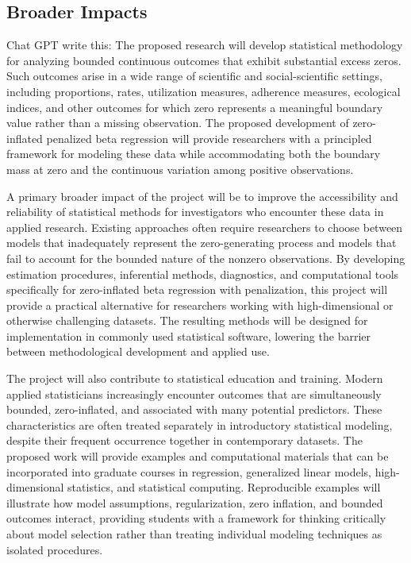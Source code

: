 \documentclass[
  11pt,
  letterpaper,
]{article}
\begin{document}
\subsection{Broader Impacts}\label{broader-impacts-2}

Chat GPT write this: The proposed research will develop statistical
methodology for analyzing bounded continuous outcomes that exhibit
substantial excess zeros. Such outcomes arise in a wide range of
scientific and social-scientific settings, including proportions, rates,
utilization measures, adherence measures, ecological indices, and other
outcomes for which zero represents a meaningful boundary value rather
than a missing observation. The proposed development of zero-inflated
penalized beta regression will provide researchers with a principled
framework for modeling these data while accommodating both the boundary
mass at zero and the continuous variation among positive observations.

A primary broader impact of the project will be to improve the
accessibility and reliability of statistical methods for investigators
who encounter these data in applied research. Existing approaches often
require researchers to choose between models that inadequately represent
the zero-generating process and models that fail to account for the
bounded nature of the nonzero observations. By developing estimation
procedures, inferential methods, diagnostics, and computational tools
specifically for zero-inflated beta regression with penalization, this
project will provide a practical alternative for researchers working
with high-dimensional or otherwise challenging datasets. The resulting
methods will be designed for implementation in commonly used statistical
software, lowering the barrier between methodological development and
applied use.

The project will also contribute to statistical education and training.
Modern applied statisticians increasingly encounter outcomes that are
simultaneously bounded, zero-inflated, and associated with many
potential predictors. These characteristics are often treated separately
in introductory statistical modeling, despite their frequent occurrence
together in contemporary datasets. The proposed work will provide
examples and computational materials that can be incorporated into
graduate courses in regression, generalized linear models,
high-dimensional statistics, and statistical computing. Reproducible
examples will illustrate how model assumptions, regularization, zero
inflation, and bounded outcomes interact, providing students with a
framework for thinking critically about model selection rather than
treating individual modeling techniques as isolated procedures.
\end{document}
